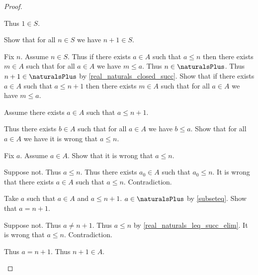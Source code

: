 \begin{proof}
\begin{subproof}
\begin{subproof}
            Thus $1\in S$.
        \end{subproof}
        Show that for all $n\in S$ we have $n + 1\in S$.
        \begin{subproof}
            Fix $n$.
            Assume $n\in S$.
            Thus if there exists $a\in A$ such that $a \leq n$ then there exists $m\in A$ such that for all $a\in A$ we have $m \leq a$.
            Thus $n\in\naturalsPlus$.
            Thus $n + 1\in\naturalsPlus$ by \cref{real_naturals_closed_succ}.
            Show that if there exists $a\in A$ such that $a \leq n + 1$ then there exists $m\in A$ such that for all $a\in A$ we have $m \leq a$.
            \begin{subproof}
                Assume there exists $a\in A$ such that $a \leq n + 1$.
                \begin{byCase}
                    Thus there exists $b\in A$ such that for all $a\in A$ we have $b \leq a$.
                    Show that for all $a\in A$ we have it is wrong that $a \leq n$.
                    \begin{subproof}
                        Fix $a$.
                        Assume $a\in A$.
                        Show that it is wrong that $a \leq n$.
                        \begin{subproof}
                            Suppose not.
                            Thus $a \leq n$.
                            Thus there exists $a_0\in A$ such that $a_0 \leq n$.
                            It is wrong that there exists $a\in A$ such that $a \leq n$.
                            Contradiction.
                        \end{subproof}
                    \end{subproof}
                    Take $a$ such that $a\in A$ and $a \leq n + 1$.
                    $a\in\naturalsPlus$ by \cref{subseteq}.
                    Show that $a = n + 1$.
                    \begin{subproof}
                        Suppose not.
                        Thus $a \neq n + 1$.
                        Thus $a \leq n$ by \cref{real_naturals_leq_succ_elim}.
                        It is wrong that $a \leq n$.
                        Contradiction.
                    \end{subproof}
                    Thus $a = n + 1$.
                    Thus $n + 1\in A$.

\end{byCase}
\end{subproof}
\end{subproof}
\end{subproof}
\end{proof}
